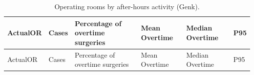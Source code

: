 \documentclass[
]{article}
\begin{document}
\begin{longtable}[]{@{}
  >{\centering\arraybackslash}p{}
  >{\centering\arraybackslash}p{}
  >{\centering\arraybackslash}p{}
  >{\centering\arraybackslash}p{}
  >{\centering\arraybackslash}p{}
  >{\centering\arraybackslash}p{}@{}}
\caption{Operating rooms by after-hours activity (Genk).
\label{tab:overtime_or}}\tabularnewline
\toprule\noalign{}
\begin{minipage}[b]{\linewidth}\centering
ActualOR
\end{minipage} & \begin{minipage}[b]{\linewidth}\centering
Cases
\end{minipage} & \begin{minipage}[b]{\linewidth}\centering
Percentage of overtime surgeries
\end{minipage} & \begin{minipage}[b]{\linewidth}\centering
Mean Overtime
\end{minipage} & \begin{minipage}[b]{\linewidth}\centering
Median Overtime
\end{minipage} & \begin{minipage}[b]{\linewidth}\centering
P95
\end{minipage} \\
\midrule\noalign{}
\endfirsthead
\toprule\noalign{}
\begin{minipage}[b]{\linewidth}\centering
ActualOR
\end{minipage} & \begin{minipage}[b]{\linewidth}\centering
Cases
\end{minipage} & \begin{minipage}[b]{\linewidth}\centering
Percentage of overtime surgeries
\end{minipage} & \begin{minipage}[b]{\linewidth}\centering
Mean Overtime
\end{minipage} & \begin{minipage}[b]{\linewidth}\centering
Median Overtime
\end{minipage} & \begin{minipage}[b]{\linewidth}\centering
P95
\end{minipage} \\

\end{longtable}
\end{document}
